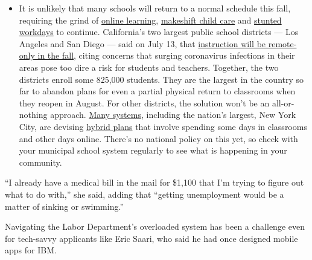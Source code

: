 \begin{itemize}
  \begin{itemize}
  \tightlist
  \item
    It is unlikely that many schools will return to a normal schedule
    this fall, requiring the grind of
    \href{https://www.nytimes.com/2020/06/05/us/coronavirus-education-lost-learning.html?action=click\&pgtype=Article\&state=default\&region=MAIN_CONTENT_3\&context=storylines_faq}{online
    learning},
    \href{https://www.nytimes.com/2020/05/29/us/coronavirus-child-care-centers.html?action=click\&pgtype=Article\&state=default\&region=MAIN_CONTENT_3\&context=storylines_faq}{makeshift
    child care} and
    \href{https://www.nytimes.com/2020/06/03/business/economy/coronavirus-working-women.html?action=click\&pgtype=Article\&state=default\&region=MAIN_CONTENT_3\&context=storylines_faq}{stunted
    workdays} to continue. California's two largest public school
    districts --- Los Angeles and San Diego --- said on July 13, that
    \href{https://www.nytimes.com/2020/07/13/us/lausd-san-diego-school-reopening.html?action=click\&pgtype=Article\&state=default\&region=MAIN_CONTENT_3\&context=storylines_faq}{instruction
    will be remote-only in the fall}, citing concerns that surging
    coronavirus infections in their areas pose too dire a risk for
    students and teachers. Together, the two districts enroll some
    825,000 students. They are the largest in the country so far to
    abandon plans for even a partial physical return to classrooms when
    they reopen in August. For other districts, the solution won't be an
    all-or-nothing approach.
    \href{https://bioethics.jhu.edu/research-and-outreach/projects/eschool-initiative/school-policy-tracker/}{Many
    systems}, including the nation's largest, New York City, are
    devising
    \href{https://www.nytimes.com/2020/06/26/us/coronavirus-schools-reopen-fall.html?action=click\&pgtype=Article\&state=default\&region=MAIN_CONTENT_3\&context=storylines_faq}{hybrid
    plans} that involve spending some days in classrooms and other days
    online. There's no national policy on this yet, so check with your
    municipal school system regularly to see what is happening in your
    community.
  \end{itemize}
\end{itemize}

``I already have a medical bill in the mail for \$1,100 that I'm trying
to figure out what to do with,'' she said, adding that ``getting
unemployment would be a matter of sinking or swimming.''

Navigating the Labor Department's overloaded system has been a challenge
even for tech-savvy applicants like Eric Saari, who said he had once
designed mobile apps for IBM.

